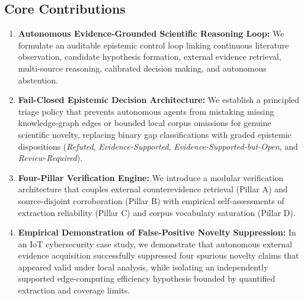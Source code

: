 \documentclass[conference,10pt]{IEEEtran}
\begin{document}
\subsection*{Core Contributions}
\begin{enumerate}[leftmargin=1.5em]
  \item \textbf{Autonomous Evidence-Grounded Scientific Reasoning Loop:} We formulate an auditable epistemic control loop linking continuous literature observation, candidate hypothesis formation, external evidence retrieval, multi-source reasoning, calibrated decision making, and autonomous abstention.
  \item \textbf{Fail-Closed Epistemic Decision Architecture:} We establish a principled triage policy that prevents autonomous agents from mistaking missing knowledge-graph edges or bounded local corpus omissions for genuine scientific novelty, replacing binary gap classifications with graded epistemic dispositions (\emph{Refuted}, \emph{Evidence-Supported}, \emph{Evidence-Supported-but-Open}, and \emph{Review-Required}).
  \item \textbf{Four-Pillar Verification Engine:} We introduce a modular verification architecture that couples external counterevidence retrieval (Pillar A) and source-disjoint corroboration (Pillar B) with empirical self-assessments of extraction reliability (Pillar C) and corpus vocabulary saturation (Pillar D).
  \item \textbf{Empirical Demonstration of False-Positive Novelty Suppression:} In an IoT cybersecurity case study, we demonstrate that autonomous external evidence acquisition successfully suppressed four spurious novelty claims that appeared valid under local analysis, while isolating an independently supported edge-computing efficiency hypothesis bounded by quantified extraction and coverage limits.
\end{enumerate}
\end{document}
